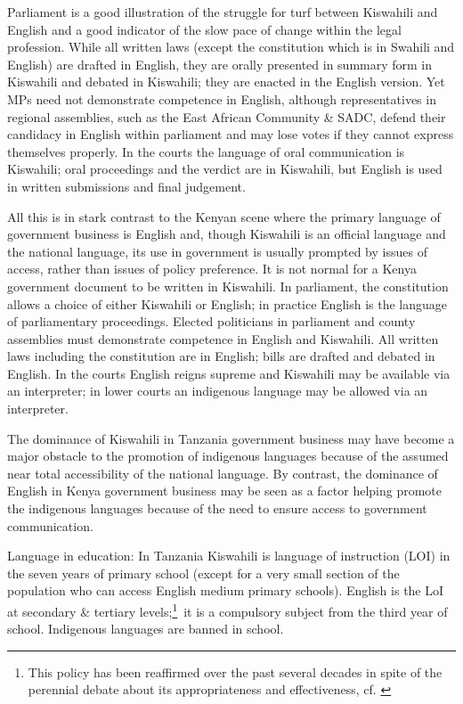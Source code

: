 \documentclass[output=paper,colorlinks,citecolor=brown]{langscibook}
\begin{document}
Parliament is a good illustration of the struggle for turf between Kiswahili and English and a good indicator of the slow pace of change within the legal profession.  While all written laws (except the constitution which is in Swahili and English) are drafted in English, they are orally presented in summary form in Kiswahili and debated in Kiswahili; they are enacted in the English version. Yet MPs need not demonstrate competence in English, although representatives in regional assemblies, such as the East African Community \& SADC, defend their candidacy in English within parliament and may lose votes if they cannot express themselves properly. In the courts the language of oral communication is Kiswahili; oral proceedings and the verdict are in Kiswahili, but English is used in written submissions and final judgement.

All this is in stark contrast to the Kenyan scene where the primary language of government business is English and, though Kiswahili is an official language and the national language, its use in government is usually prompted by issues of access, rather than issues of policy preference. It is not normal for a Kenya government document to be written in Kiswahili. In parliament, the constitution allows a choice of either Kiswahili or English; in practice English is the language of parliamentary proceedings. Elected politicians in parliament and county assemblies must demonstrate competence in English and Kiswahili.  All written laws including the constitution are in English; bills are drafted and debated in English. In the courts English reigns supreme and Kiswahili may be available via an interpreter; in lower courts an indigenous language may be allowed via an interpreter.

The dominance of Kiswahili in Tanzania government business may have become a major obstacle to the promotion of indigenous languages because of the assumed near total accessibility of the national language. By contrast, the dominance of English in Kenya government business may be seen as a factor helping promote the indigenous languages because of the need to ensure access to government communication.

Language in education: In Tanzania Kiswahili is language of instruction (LOI) in the seven years of primary school (except for a very small section of the population who can access English medium primary schools). English is the LoI at secondary \& tertiary levels;\footnote{This policy has been reaffirmed over the past several decades in spite of the perennial debate about its appropriateness and effectiveness, cf. \citep{Tanzania-Government1995, Tanzania-Government2014, QorroEtAl2012}}~it is a compulsory subject from the third year of school. Indigenous languages are banned in school.
\end{document}
